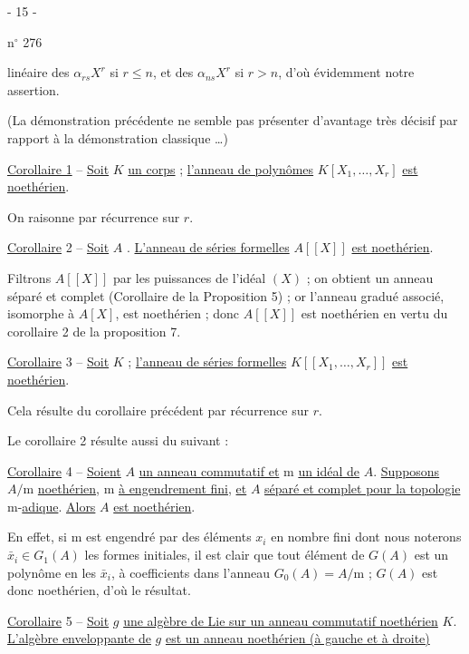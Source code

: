 \begin{center}- 15 -\end{center}
\hfill n$^\circ$ 276

linéaire des $\alpha_{rs}X^r$ si $r\leq n$, et des $\alpha_{ns}X^r$ si $r>n$, d'où évidemment notre assertion.

(La démonstration précédente ne semble pas présenter d'avantage très décisif par rapport à la démonstration classique \ldots)

\uline{Corollaire 1} -- \uline{Soit} $K$ \uline{un corps} ; \uline{l'anneau de polynômes} $K[X_1,\ldots,X_r]$ \uline{est noethérien}.

On raisonne par récurrence sur $r$.

\uline{Corollaire} 2 -- \uline{Soit} $A$ . \uline{L'anneau de séries formelles} $A[[X]]$ \uline{est noethérien}.

Filtrons $A[[X]]$ par les puissances de l'idéal $(X)$ ; on obtient un anneau séparé et complet (Corollaire de la Proposition 5) ; or l'anneau gradué associé, isomorphe à $A[X]$, est noethérien ; donc $A[[X]]$ est noethérien en vertu du corollaire 2 de la proposition 7.

\uline{Corollaire} 3 -- \uline{Soit} $K$  ; \uline{l'anneau de séries formelles} $K[[X_1,\ldots,X_r]]$ \uline{est noethérien}.

Cela résulte du corollaire précédent par récurrence sur $r$.

Le corollaire 2 résulte aussi du suivant :

\uline{Corollaire} 4 -- \uline{Soient} $A$ \uline{un anneau commutatif et} $\mathrm m$ \uline{un idéal de} $A$. \uline{Supposons} $A/\mathrm m$ \uline{noethérien}, $\mathrm m$ \uline{à engendrement fini}, \uline{et} $A$ \uline{séparé et complet pour la topologie} $\mathrm m$-\uline{adique}. \uline{Alors} $A$ \uline{est noethérien}.

En effet, si $\mathrm m$ est engendré par des éléments $x_i$ en nombre fini dont nous noterons $\bar x_i\in G_1(A)$ les formes initiales, il est clair que tout élément de $G(A)$ est un polynôme en les $\bar x_i$, à coefficients dans l'anneau $G_0(A)=A/\mathrm m$ ; $G(A)$ est donc noethérien, d'où le résultat.

\uline{Corollaire} 5 -- \uline{Soit} $g$ \uline{une algèbre de Lie sur un anneau commutatif noethérien} $K$. \uline{L'algèbre enveloppante de} $g$ \uline{est un anneau noethérien (à gauche et à droite)}
